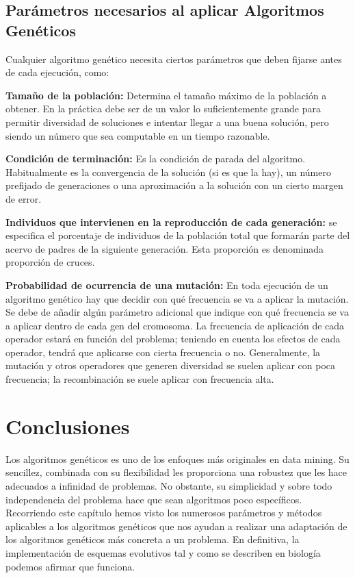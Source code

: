 \documentclass[
  a4paper,
  DIV=11,
  numbers=noendperiod]{scrreprt}
\begin{document}
\hypertarget{paruxe1metros-necesarios-al-aplicar-algoritmos-genuxe9ticos}{%
\subsection{Parámetros necesarios al aplicar Algoritmos
Genéticos}\label{paruxe1metros-necesarios-al-aplicar-algoritmos-genuxe9ticos}}

Cualquier algoritmo genético necesita ciertos parámetros que deben
fijarse antes de cada ejecución, como:

\textbf{Tamaño de la población:} Determina el tamaño máximo de la
población a obtener. En la práctica debe ser de un valor lo
suficientemente grande para permitir diversidad de soluciones e intentar
llegar a una buena solución, pero siendo un número que sea computable en
un tiempo razonable.

\textbf{Condición de terminación:} Es la condición de parada del
algoritmo. Habitualmente es la convergencia de la solución (si es que la
hay), un número prefijado de generaciones o una aproximación a la
solución con un cierto margen de error.

\textbf{Individuos que intervienen en la reproducción de cada
generación:} se especifica el porcentaje de individuos de la población
total que formarán parte del acervo de padres de la siguiente
generación. Esta proporción es denominada proporción de cruces.

\textbf{Probabilidad de ocurrencia de una mutación:} En toda ejecución
de un algoritmo genético hay que decidir con qué frecuencia se va a
aplicar la mutación. Se debe de añadir algún parámetro adicional que
indique con qué frecuencia se va a aplicar dentro de cada gen del
cromosoma. La frecuencia de aplicación de cada operador estará en
función del problema; teniendo en cuenta los efectos de cada operador,
tendrá que aplicarse con cierta frecuencia o no. Generalmente, la
mutación y otros operadores que generen diversidad se suelen aplicar con
poca frecuencia; la recombinación se suele aplicar con frecuencia alta.

\hypertarget{conclusiones}{%
\section{Conclusiones}\label{conclusiones}}

Los algoritmos genéticos es uno de los enfoques más originales en data
mining. Su sencillez, combinada con su flexibilidad les proporciona una
robustez que les hace adecuados a infinidad de problemas. No obstante,
su simplicidad y sobre todo independencia del problema hace que sean
algoritmos poco específicos. Recorriendo este capítulo hemos visto los
numerosos parámetros y métodos aplicables a los algoritmos genéticos que
nos ayudan a realizar una adaptación de los algoritmos genéticos más
concreta a un problema. En definitiva, la implementación de esquemas
evolutivos tal y como se describen en biología podemos afirmar que
funciona.
\end{document}
